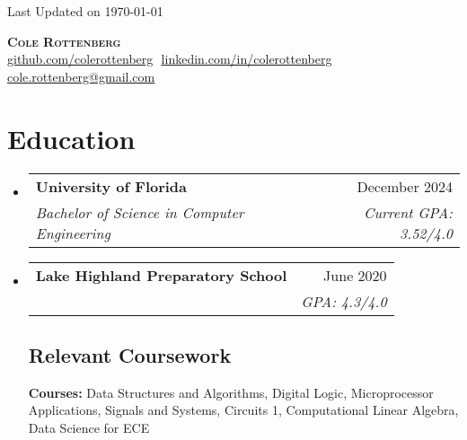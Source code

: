 \documentclass[letterpaper,11pt]{article}
\makeatletter
\newcommand{\resumeSubheading}[4]{
  \vspace{-2pt}\item
    \begin{tabular*}{0.97\textwidth}[t]{l@{\extracolsep{\fill}}r}
      \textbf{#1} & #2 \\
      \textit{\small#3} & \textit{\small #4} \\
    \end{tabular*}\vspace{-7pt}
}
\newcommand{\resumeSubHeadingListStart}{\begin{itemize}[leftmargin=0.15in, label={}]}
\newcommand{\resumeSubHeadingListEnd}{\end{itemize}}
\makeatother
\begin{document}
\begin{flushright}
  \vspace{-4pt}
  \color{gray}
  \item
  Last Updated on \today 
\end{flushright}

\vspace{-7pt}

\begin{center}
    \textbf{\Large \scshape Cole Rottenberg } \\ \vspace{8pt}
    \small 
    \href{https://github.com/johnDoe}{\underline{github.com/colerottenberg}} $  $
    \href{https://linkedin.com/in/colerottenberg}{\underline{linkedin.com/in/colerottenberg}} $  $
    \href{mailto:cole.rottenberg@gmail.com}
    {\underline{cole.rottenberg@gmail.com}}
\end{center}

\section{Education}
  \resumeSubHeadingListStart
  
    \resumeSubheading
      {University of Florida}{December 2024}
      {Bachelor of Science in Computer Engineering}{Current GPA: 3.52/4.0}
      
    \resumeSubheading
      {Lake Highland Preparatory School }{June 2020}
      {}{GPA: 4.3/4.0}

    \vspace{-10pt}
    \subsection{Relevant Coursework}
      \textbf{Courses:} Data Structures and Algorithms, Digital Logic, Microprocessor Applications, Signals and Systems, Circuits 1, Computational Linear Algebra, Data Science for ECE\\

  \resumeSubHeadingListEnd

\end{document}
